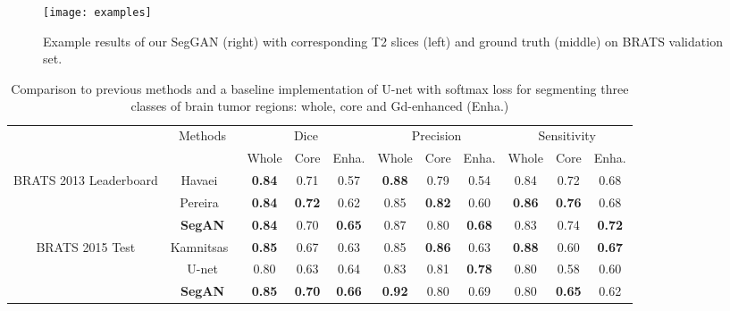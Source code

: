 \documentclass[twocolumn]{svjour3}
\begin{document}
\begin{figure}
  \texttt{[image: examples]}  \caption{Example results of our SegGAN (right) with corresponding T2 slices (left) and ground truth (middle) on BRATS validation set.}
\label{fig:examples}

 \label{sec:comparison}
\end{figure}


\begin{table*}[!htbp]
	\caption{Comparison to previous methods and a baseline implementation of U-net with softmax loss for segmenting three classes of brain tumor regions: whole, core and Gd-enhanced (Enha.)}
\label{tb:result}
	\centering
	\begin{tabular}{c|c|c|c|c|c|c|c|c|c|c}	
		\cline{1-11}
\multirow{2}{2cm}{}&\multirow{2}{*}{Methods} & \multicolumn{3}{|c}{Dice} &
\multicolumn{3}{|c}{Precision} & \multicolumn{3}{|c}{Sensitivity} \\
		\cline{3-11}
		            & & Whole& Core & Enha. & Whole& Core & Enha. & Whole& Core & Enha.\\
		\hline					
\multirow{3}{1.8cm}{BRATS 2013 Leaderboard}
&Havaei~\cite{havaei2017brain} &
		   \textbf{0.84} &0.71 &0.57              &\textbf{0.88} &0.79 &0.54  &0.84 &0.72 &0.68 \\
		\cline{2-11}
&Pereira~\cite{pereira2016brain} &
			\textbf{0.84} &\textbf{0.72} &0.62     &0.85 &\textbf{0.82} &0.60  &\textbf{0.86} &\textbf{0.76} &0.68\\
		\cline{2-11}
&\textbf{SegAN} &
    	   \textbf{0.84} & 0.70 & \textbf{0.65}   &0.87 &0.80 &\textbf{0.68}  &0.83 & 0.74 &\textbf{0.72}\\
\hline
		\hline
		

\multirow{3}{1.8cm}{BRATS 2015 Test} &Kamnitsas~\cite{kamnitsas2017efficient} &
            \textbf{0.85} &0.67 &{0.63}      &0.85 &\textbf{0.86} &0.63  &\textbf{0.88} &0.60 &\textbf{0.67}\\
        \cline{2-11}
&U-net &
         0.80 &0.63 &0.64             &0.83 &0.81 &\textbf{0.78}             &0.80 &0.58 &0.60\\
        \cline{2-11}
&\textbf{SegAN} &
    	   \textbf{0.85} &\textbf{0.70} &\textbf{0.66}  &\textbf{0.92} &0.80 &0.69 &0.80 &\textbf{0.65} &0.62\\
    	

		\hline
	\end{tabular}
\end{table*}
\end{document}

